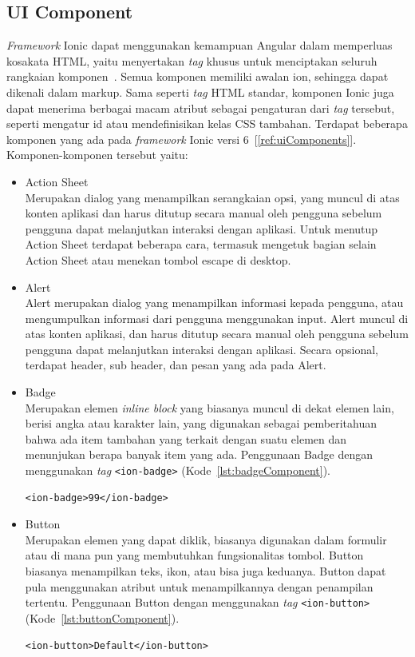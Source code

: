 \subsection{UI Component}
\label{subsec:uiComponent}
{\it Framework} Ionic dapat menggunakan kemampuan Angular dalam memperluas kosakata HTML, yaitu menyertakan {\it tag} khusus untuk menciptakan seluruh rangkaian komponen~\cite{griffith:17:mobile}. Semua komponen memiliki awalan ion, sehingga dapat dikenali dalam markup. Sama seperti {\it tag} HTML standar, komponen Ionic juga dapat menerima berbagai macam atribut sebagai pengaturan dari {\it tag} tersebut, seperti mengatur id atau mendefinisikan kelas CSS tambahan. Terdapat beberapa komponen yang ada pada {\it framework} Ionic versi 6~[\ref{ref:uiComponents}]. Komponen-komponen tersebut yaitu:
\begin{itemize}
	\item Action Sheet \\
	Merupakan dialog yang menampilkan serangkaian opsi, yang muncul di atas konten aplikasi dan harus ditutup secara manual oleh pengguna sebelum pengguna dapat melanjutkan interaksi dengan aplikasi. Untuk menutup Action Sheet terdapat beberapa cara, termasuk mengetuk bagian selain Action Sheet atau menekan tombol escape di desktop.

	\item Alert \\
	Alert merupakan dialog yang menampilkan informasi kepada pengguna, atau mengumpulkan informasi dari pengguna menggunakan input. Alert muncul di atas konten aplikasi, dan harus ditutup secara manual oleh pengguna sebelum pengguna dapat melanjutkan interaksi dengan aplikasi. Secara opsional, terdapat header, sub header, dan pesan yang ada pada Alert.
	\item Badge \\
	Merupakan elemen {\it inline block} yang biasanya muncul di dekat elemen lain, berisi angka atau karakter lain, yang digunakan sebagai pemberitahuan bahwa ada item tambahan yang terkait dengan suatu elemen dan menunjukan berapa banyak item yang ada. Penggunaan Badge dengan menggunakan {\it tag} \texttt{<ion-badge>} (Kode~\ref{lst:badgeComponent}).
\begin{lstlisting}[label={lst:badgeComponent}, caption=Potongan Kode Program dari Badge Component]
<ion-badge>99</ion-badge>
\end{lstlisting} 
	\item Button \\
	Merupakan elemen yang dapat diklik, biasanya digunakan dalam formulir atau di mana pun yang membutuhkan fungsionalitas tombol. Button biasanya menampilkan teks, ikon, atau bisa juga keduanya. Button dapat pula menggunakan atribut untuk menampilkannya dengan penampilan tertentu. Penggunaan Button dengan menggunakan {\it tag} \texttt{<ion-button>} (Kode~\ref{lst:buttonComponent}). 
\begin{lstlisting}[label={lst:buttonComponent}, caption=Potongan Kode Program dari Button Component]
<ion-button>Default</ion-button>
\end{lstlisting} 


\end{itemize}
